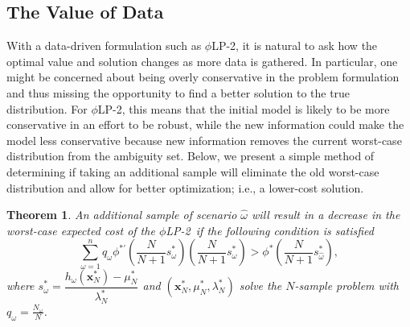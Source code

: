 \documentclass[12pt]{article}
\newcommand{\x}{\mathbf{x}}
\theoremstyle{plain}
\newtheorem{theorem}{Theorem}
\theoremstyle{definition}
\theoremstyle{remark}
\newcommand{\plp}{$\phi$LP-2}
\begin{document}
\subsection{The Value of Data} \label{ssec:value}

With a data-driven formulation such as \plp, it is natural to ask how the optimal value and solution changes as more data is gathered.
In particular, %
one might be concerned about being overly conservative in the problem formulation and thus missing the opportunity to find a better solution to the true distribution.
For \plp, this means that the initial model is likely to be more conservative in an effort to be robust, while the new information could make the model less conservative because new information removes the current worst-case distribution from the ambiguity set.  
Below, we present a simple method of determining if taking an additional sample will eliminate the old worst-case distribution and allow for better optimization; i.e., a lower-cost solution.

\begin{theorem}
	\label{thm:value}
	An additional sample of scenario $\hat{\omega}$ will result in a decrease in the worst-case expected cost of the \plp\ if the following condition is satisfied
	\begin{equation} \label{eq:cost_decrease_cond}
		\sum_{\omega=1}^n q_\omega \phi^{*\prime}\left(\frac{N}{N+1}s^*_\omega\right) \left(\frac{N}{N+1}s^*_\omega\right) > \phi^*\left(\frac{N}{N+1}s^*_{\hat{\omega}}\right),
	\end{equation}
	where $s^*_\omega = \dfrac{h_\omega(\x^*_N) - \mu^*_N}{\lambda^*_N}$ and $(\x^*_N,\mu^*_N,\lambda^*_N)$ solve the $N$-sample problem with $q_\omega = \tfrac{N_\omega}{N}$.
\end{theorem}
\end{document}
